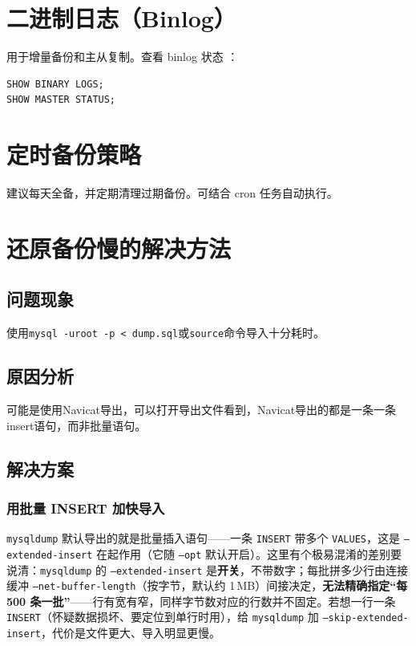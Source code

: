 \documentclass[12pt,UTF8]{ctexbook}
\begin{document}
\section{二进制日志（Binlog）}

用于增量备份和主从复制。查看 binlog 状态
：
\begin{lstlisting}
SHOW BINARY LOGS;
SHOW MASTER STATUS;
\end{lstlisting}

\section{定时备份策略}

建议每天全备，并定期清理过期备份。可结合 cron 任务自动执行。

\section{还原备份慢的解决方法}

\subsection{问题现象}

使用\verb|mysql -uroot -p < dump.sql|或\verb|source|命令导入十分耗时。

\subsection{原因分析}

可能是使用Navicat导出，可以打开导出文件看到，Navicat导出的都是一条一条insert语句，而非批量语句。

\subsection{解决方案}

\subsubsection{用批量 INSERT 加快导入}

\texttt{mysqldump} 默认导出的就是批量插入语句——一条 \texttt{INSERT} 带多个 \texttt{VALUES}，这是 \texttt{--extended-insert} 在起作用（它随 \texttt{--opt} 默认开启）。这里有个极易混淆的差别要说清：\texttt{mysqldump} 的 \texttt{--extended-insert} 是\textbf{开关}，不带数字；每批拼多少行由连接缓冲 \texttt{--net-buffer-length}（按字节，默认约 1\,MB）间接决定，\textbf{无法精确指定“每 500 条一批”}——行有宽有窄，同样字节数对应的行数并不固定。若想一行一条 \texttt{INSERT}（怀疑数据损坏、要定位到单行时用），给 \texttt{mysqldump} 加 \texttt{--skip-extended-insert}，代价是文件更大、导入明显更慢。
\end{document}
